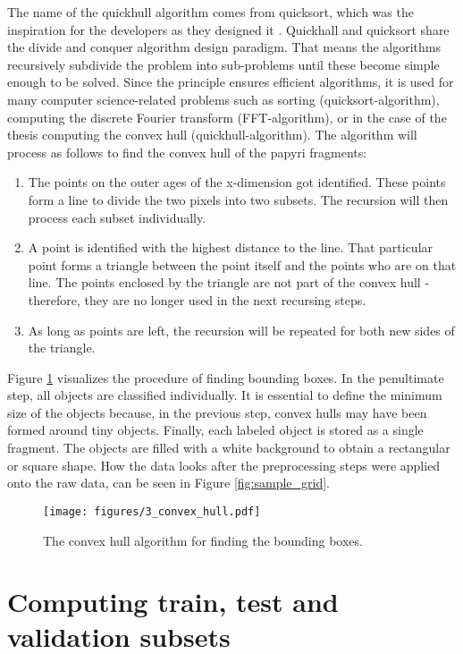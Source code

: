 \noindent The name of the quickhull algorithm comes from quicksort, which was the inspiration for the developers as they designed it \cite{Barber96}. Quickhall and quicksort share the divide and conquer algorithm design paradigm. That means the algorithms recursively subdivide the problem into sub-problems until these become simple enough to be solved. Since the principle ensures efficient algorithms, it is used for many computer science-related problems such as sorting (quicksort-algorithm), computing the discrete Fourier transform (FFT-algorithm), or in the case of the thesis computing the convex hull (quickhull-algorithm). The algorithm will process as follows to find the convex hull of the papyri fragments: 
\begin{enumerate}
	\item The points on the outer ages of the x-dimension got identified. These points form a line to divide the two pixels into two subsets. The recursion will then process each subset individually.
	\item A point is identified with the highest distance to the line. That particular point forms a triangle between the point itself and the points who are on that line. The points enclosed by the triangle are not part of the convex hull - therefore, they are no longer used in the next recursing steps. 
	\item As long as points are left, the recursion will be repeated for both new sides of the triangle. 
\end{enumerate}

\noindent Figure \ref{fig:convex_hull} visualizes the procedure of finding bounding boxes. In the penultimate step, all objects are classified individually. It is essential to define the minimum size of the objects because, in the previous step, convex hulls may have been formed around tiny objects. Finally, each labeled object is stored as a single fragment. The objects are filled with a white background to obtain a rectangular or square shape. How the data looks after the preprocessing steps were applied onto the raw data, can be seen in Figure \ref{fig:sample_grid}.

\begin{figure}[t]
	\label{fig:convex_hull}
	\texttt{[image: figures/3\_convex\_hull.pdf]}
	\caption{The convex hull algorithm for finding the bounding boxes.}
\end{figure}


\section{Computing train, test and validation subsets}
\label{sec:trainTestSplit}

